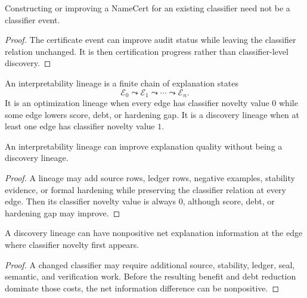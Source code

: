 \begin{theorem}
\label{thm:philosophy-certificate-events-not-classifier-events}
Constructing or improving a NameCert for an existing classifier need not
be a classifier event.
\end{theorem}
\begin{proof}
The certificate event can improve audit status while leaving the
classifier relation unchanged. It is then certification progress rather
than classifier-level discovery.
\end{proof}

\begin{definition}
\label{def:philosophy-interpretability-lineage}
An interpretability lineage is a finite chain of explanation states
$$
\mathcal E_0\leadsto
\mathcal E_1\leadsto
\cdots\leadsto
\mathcal E_n.
$$
It is an optimization lineage when every edge has classifier novelty
value $0$ while some edge lowers score, debt, or hardening gap. It is a
discovery lineage when at least one edge has classifier novelty value
$1$.
\end{definition}

\begin{theorem}
\label{thm:philosophy-optimization-lineage-not-discovery-lineage}
An interpretability lineage can improve explanation quality without
being a discovery lineage.
\end{theorem}
\begin{proof}
A lineage may add source rows, ledger rows, negative examples,
stability evidence, or formal hardening while preserving the classifier
relation at every edge. Then its classifier novelty value is always $0$,
although score, debt, or hardening gap may improve.
\end{proof}

\begin{theorem}
\label{thm:philosophy-discovery-lineage-not-immediately-positive}
A discovery lineage can have nonpositive net explanation information at
the edge where classifier novelty first appears.
\end{theorem}
\begin{proof}
A changed classifier may require additional source, stability, ledger,
seal, semantic, and verification work. Before the resulting benefit and
debt reduction dominate those costs, the net information difference can
be nonpositive.
\end{proof}

